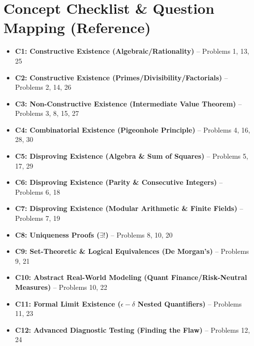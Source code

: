 \documentclass[11pt]{article}
\begin{document}
\clearpage

\section{Concept Checklist \& Question Mapping (Reference)}
\label{sec:checklist_end}
\begin{itemize}
    \item \textbf{C1: Constructive Existence (Algebraic/Rationality)} -- Problems 1, 13, 25
    \item \textbf{C2: Constructive Existence (Primes/Divisibility/Factorials)} -- Problems 2, 14, 26
    \item \textbf{C3: Non-Constructive Existence (Intermediate Value Theorem)} -- Problems 3, 8, 15, 27
    \item \textbf{C4: Combinatorial Existence (Pigeonhole Principle)} -- Problems 4, 16, 28, 30
    \item \textbf{C5: Disproving Existence (Algebra \& Sum of Squares)} -- Problems 5, 17, 29
    \item \textbf{C6: Disproving Existence (Parity \& Consecutive Integers)} -- Problems 6, 18
    \item \textbf{C7: Disproving Existence (Modular Arithmetic \& Finite Fields)} -- Problems 7, 19
    \item \textbf{C8: Uniqueness Proofs ($\exists!$)} -- Problems 8, 10, 20
    \item \textbf{C9: Set-Theoretic \& Logical Equivalences (De Morgan's)} -- Problems 9, 21
    \item \textbf{C10: Abstract Real-World Modeling (Quant Finance/Risk-Neutral Measures)} -- Problems 10, 22
    \item \textbf{C11: Formal Limit Existence ($\epsilon-\delta$ Nested Quantifiers)} -- Problems 11, 23
    \item \textbf{C12: Advanced Diagnostic Testing (Finding the Flaw)} -- Problems 12, 24
\end{itemize}
\end{document}
